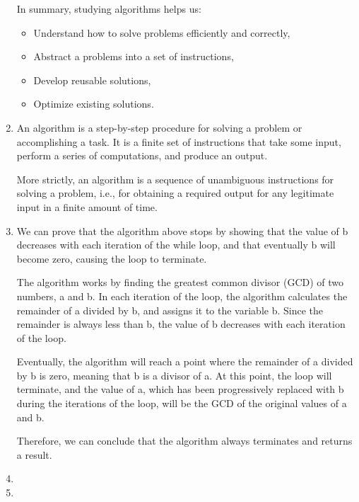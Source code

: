\documentclass{article}
\begin{document}
\begin{enumerate}
    In summary, studying algorithms helps us: 
    \begin{itemize}
        \item Understand how to solve problems efficiently and correctly, 
        \item Abstract a problems into a set of instructions, 
        \item Develop reusable solutions, 
        \item Optimize existing solutions.
    \end{itemize}

    
    \item  An algorithm is a step-by-step procedure for solving a problem or accomplishing a task. It is a finite set of instructions that take some input, perform a series of computations, and produce an output.
    
    More strictly, an algorithm is a sequence of unambiguous instructions for solving a problem, i.e., for obtaining a required output for any legitimate input in a finite amount of time.
    
    \item 
    
    
    
    
    We can prove that the algorithm above stops by showing that the value of b decreases with each iteration of the while loop, and that eventually b will become zero, causing the loop to terminate.
    
    The algorithm works by finding the greatest common divisor (GCD) of two numbers, a and b. In each iteration of the loop, the algorithm calculates the remainder of a divided by b, and assigns it to the variable b. Since the remainder is always less than b, the value of b decreases with each iteration of the loop.
    
    Eventually, the algorithm will reach a point where the remainder of a divided by b is zero, meaning that b is a divisor of a. At this point, the loop will terminate, and the value of a, which has been progressively replaced with b during the iterations of the loop, will be the GCD of the original values of a and b.
    
    Therefore, we can conclude that the algorithm always terminates and returns a result.

    \item 
    
    \item  
    

\end{enumerate}
\end{document}
